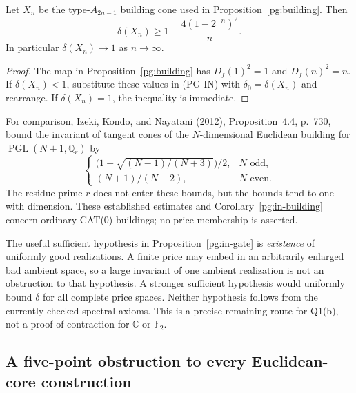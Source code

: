 \begin{corollary}[PG-IN-BUILDING]
\label{pg:in-building}
Let $X_n$ be the type-$A_{2n-1}$ building cone used in
Proposition~\ref{pg:building}. Then
\[
 \delta(X_n)\geq
 1-\frac{4(1-2^{-n})^2}{n}.
\]
In particular $\delta(X_n)\to1$ as $n\to\infty$.
\end{corollary}
\begin{proof}
The map in Proposition~\ref{pg:building} has
$D_f(1)^2=1$ and $D_f(n)^2=n$. If $\delta(X_n)<1$, substitute these
values in (PG-IN) with $\delta_0=\delta(X_n)$ and rearrange. If
$\delta(X_n)=1$, the inequality is immediate.
\end{proof}

For comparison, Izeki, Kondo, and Nayatani (2012), Proposition~4.4,
p.~730, bound the invariant of tangent cones of the $N$-dimensional
Euclidean building for $\operatorname{PGL}(N+1,\mathbb Q_r)$ by
\[
 \begin{cases}
 \bigl(1+\sqrt{(N-1)/(N+3)}\bigr)/2,&N\text{ odd},\\
 (N+1)/(N+2),&N\text{ even}.
 \end{cases}
\]
The residue prime $r$ does not enter these bounds, but the bounds tend to
one with dimension. These established estimates and
Corollary~\ref{pg:in-building} concern ordinary CAT(0) buildings;
no price membership is asserted.

The useful sufficient hypothesis in Proposition~\ref{pg:in-gate} is
\emph{existence} of uniformly good realizations. A finite price may
embed in an arbitrarily enlarged bad ambient space, so a large invariant
of one ambient realization is not an obstruction to that hypothesis.
A stronger sufficient hypothesis would uniformly bound $\delta$ for all
complete price spaces. Neither hypothesis follows from the currently
checked spectral axioms. This is a precise remaining route for Q1(b),
not a proof of contraction for $\mathbb C$ or $\mathbb F_2$.

\subsection{A five-point obstruction to every Euclidean-core construction}

